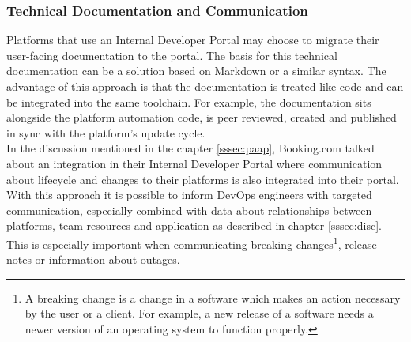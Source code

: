 \documentclass[a4paper,12pt]{article}
\begin{document}
    \subsubsection{Technical Documentation and Communication}
    \label{sssec:techdoc}
    Platforms that use an Internal Developer Portal may choose to migrate their user-facing documentation to the portal.
    The basis for this technical documentation can be a solution based on Markdown\parencite{backstagetechdocs}
    or a similar syntax.
    The advantage of this approach is that the documentation is treated like code and can be integrated into the same toolchain.
    For example, the documentation sits alongside the platform automation code, is peer reviewed, created
    and published in sync with the platform's update cycle.\\
    In the discussion mentioned in the chapter \ref{sssec:paap}, Booking.com talked about an integration in their Internal
    Developer Portal  where communication about lifecycle and changes to their platforms is also integrated into their portal.
    With this approach it is possible to inform DevOps engineers with targeted communication, especially combined with data about relationships
    between platforms, team resources and application as described in chapter \ref{sssec:disc}.
    This is especially important when communicating breaking changes\footnote{A breaking change is a change in a software
    which makes an action necessary by the user or a client. For example, a new release of a software needs a newer version
    of an operating system to function properly.}, release notes or information about outages.
\end{document}
